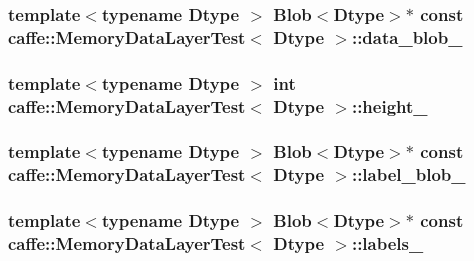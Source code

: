 \hypertarget{classcaffe_1_1_memory_data_layer_test_a4b580c8596ec6ce0811a3b785006c9fe}{
\subsubsection[{data\+\_\+blob\+\_\+}]{\setlength{\rightskip}{0pt plus 5cm}template$<$typename Dtype $>$ {\bf Blob}$<$Dtype$>$$\ast$ const {\bf caffe\+::\+Memory\+Data\+Layer\+Test}$<$ Dtype $>$\+::data\+\_\+blob\+\_\+\hspace{0.3cm}{\ttfamily [protected]}}}\label{classcaffe_1_1_memory_data_layer_test_a4b580c8596ec6ce0811a3b785006c9fe}
\hypertarget{classcaffe_1_1_memory_data_layer_test_ac6f8872f971ff23b79987a812cf6dcac}{
\subsubsection[{height\+\_\+}]{\setlength{\rightskip}{0pt plus 5cm}template$<$typename Dtype $>$ int {\bf caffe\+::\+Memory\+Data\+Layer\+Test}$<$ Dtype $>$\+::height\+\_\+\hspace{0.3cm}{\ttfamily [protected]}}}\label{classcaffe_1_1_memory_data_layer_test_ac6f8872f971ff23b79987a812cf6dcac}
\hypertarget{classcaffe_1_1_memory_data_layer_test_a60268033c066e92f4ba6f7b1fa796ab1}{
\subsubsection[{label\+\_\+blob\+\_\+}]{\setlength{\rightskip}{0pt plus 5cm}template$<$typename Dtype $>$ {\bf Blob}$<$Dtype$>$$\ast$ const {\bf caffe\+::\+Memory\+Data\+Layer\+Test}$<$ Dtype $>$\+::label\+\_\+blob\+\_\+\hspace{0.3cm}{\ttfamily [protected]}}}\label{classcaffe_1_1_memory_data_layer_test_a60268033c066e92f4ba6f7b1fa796ab1}
\hypertarget{classcaffe_1_1_memory_data_layer_test_a2a1b780a38e483da5da7de0852406b0f}{
\subsubsection[{labels\+\_\+}]{\setlength{\rightskip}{0pt plus 5cm}template$<$typename Dtype $>$ {\bf Blob}$<$Dtype$>$$\ast$ const {\bf caffe\+::\+Memory\+Data\+Layer\+Test}$<$ Dtype $>$\+::labels\+\_\+\hspace{0.3cm}{\ttfamily [protected]}}}\label{classcaffe_1_1_memory_data_layer_test_a2a1b780a38e483da5da7de0852406b0f}
